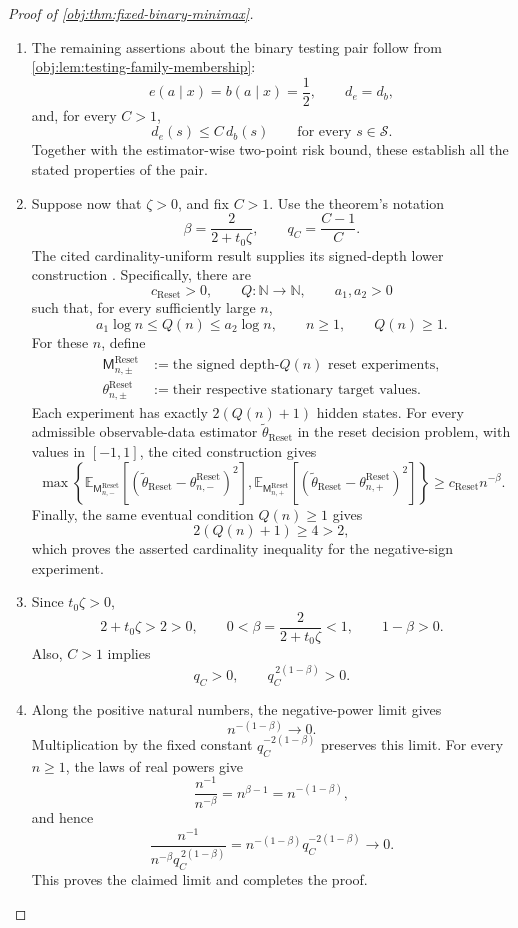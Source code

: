 \begin{proof}[Proof of \cref{obj:thm:fixed-binary-minimax}]
\begin{enumerate}
\item The remaining assertions about the binary testing pair follow from
\cref{obj:lem:testing-family-membership}:
\[
e(a\mid x)=b(a\mid x)=\frac12,
\qquad d_e=d_b,
\]
and, for every \(C>1\),
\[
d_e(s)\leq C\,d_b(s)
\qquad\text{for every }s\in\mathcal S.
\]
Together with the estimator-wise two-point risk bound, these establish all the stated properties of the pair.

\item Suppose now that \(\zeta>0\), and fix \(C>1\). Use the theorem's notation
\[
\beta=\frac2{2+t_0\zeta},
\qquad
q_C=\frac{C-1}{C}.
\]
The cited cardinality-uniform result supplies its signed-depth lower construction
\citep[Theorem 1 (Uniform overlap frontier) and the Signed-depth family definition]{CausalSmithLatentOverlap2026}.
Specifically, there are
\[
c_{\mathrm{Reset}}>0,\qquad
Q:\mathbb N\to\mathbb N,\qquad a_1,a_2>0
\]
such that, for every sufficiently large \(n\),
\[
a_1\log n\leq Q(n)\leq a_2\log n,
\qquad n\geq1,\qquad Q(n)\geq1.
\]
For these \(n\), define
\[
\begin{aligned}
\mathsf M_{n,\pm}^{\mathrm{Reset}}
&:=\text{the signed depth-}Q(n)\text{ reset experiments},\\
\theta_{n,\pm}^{\mathrm{Reset}}
&:=\text{their respective stationary target values}.
\end{aligned}
\]
Each experiment has exactly \(2(Q(n)+1)\) hidden states. For every admissible observable-data estimator
\(\widetilde\theta_{\mathrm{Reset}}\) in the reset decision problem, with values in \([-1,1]\), the cited construction gives
\[
\max\left\{
\mathbb E_{\mathsf M_{n,-}^{\mathrm{Reset}}}
[(\widetilde\theta_{\mathrm{Reset}}
-\theta_{n,-}^{\mathrm{Reset}})^2],
\mathbb E_{\mathsf M_{n,+}^{\mathrm{Reset}}}
[(\widetilde\theta_{\mathrm{Reset}}
-\theta_{n,+}^{\mathrm{Reset}})^2]
\right\}
\geq c_{\mathrm{Reset}}n^{-\beta}.
\]
Finally, the same eventual condition \(Q(n)\geq1\) gives
\[
2(Q(n)+1)\geq4>2,
\]
which proves the asserted cardinality inequality for the negative-sign experiment.

\item Since \(t_0\zeta>0\),
\[
2+t_0\zeta>2>0,
\qquad
0<\beta=\frac2{2+t_0\zeta}<1,
\qquad
1-\beta>0.
\]
Also, \(C>1\) implies
\[
q_C>0,
\qquad q_C^{\,2(1-\beta)}>0.
\]

\item Along the positive natural numbers, the negative-power limit gives
\[
n^{-(1-\beta)}\longrightarrow0.
\]
Multiplication by the fixed constant
\(q_C^{-2(1-\beta)}\) preserves this limit. For every \(n\geq1\), the laws of real powers give
\[
\frac{n^{-1}}{n^{-\beta}}
=n^{\beta-1}=n^{-(1-\beta)},
\]
and hence
\[
\frac{n^{-1}}
{n^{-\beta}q_C^{\,2(1-\beta)}}
=
n^{-(1-\beta)}q_C^{-2(1-\beta)}
\longrightarrow0.
\]
This proves the claimed limit and completes the proof.
\end{enumerate}
\end{proof}

